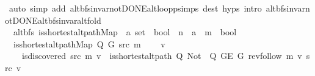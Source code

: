 \begin{isabellebody}
\ {\isacharparenleft}{\kern0pt}auto\ simp\ add{\isacharcolon}{\kern0pt}\ alt{\isacharunderscore}{\kern0pt}bfs{\isacharunderscore}{\kern0pt}invar{\isacharunderscore}{\kern0pt}not{\isacharunderscore}{\kern0pt}DONE{\isachardot}{\kern0pt}alt{\isacharunderscore}{\kern0pt}loop{\isacharunderscore}{\kern0pt}psimps\ dest{\isacharcolon}{\kern0pt}\ {\isachardoublequoteopen}{}{\isachardot}{\kern0pt}hyps{\isachardoublequoteclose}\ intro{\isacharcolon}{\kern0pt}\ alt{\isacharunderscore}{\kern0pt}bfs{\isacharunderscore}{\kern0pt}invar{\isacharunderscore}{\kern0pt}not{\isacharunderscore}{\kern0pt}DONE{\isachardot}{\kern0pt}alt{\isacharunderscore}{\kern0pt}bfs{\isacharunderscore}{\kern0pt}invar{\isacharunderscore}{\kern0pt}alt{\isacharunderscore}{\kern0pt}fold{\isacharparenright}{\kern0pt}\isanewline
\ \ \isamarkupfalse%
\isanewline
{}\isamarkupfalse%
%
\endisatagproof
{\isafoldproof}%
%
\isadelimproof
%
\endisadelimproof
%
\isadelimdocument
%
\endisadelimdocument
%
\isatagdocument
%
\isamarkuptrue%
%
\endisatagdocument
{\isafolddocument}%
%
\isadelimdocument
%
\endisadelimdocument
{}\isamarkupfalse%
\ {\isacharparenleft}{\kern0pt}\ alt{\isacharunderscore}{\kern0pt}bfs{\isacharparenright}{\kern0pt}\ is{\isacharunderscore}{\kern0pt}shortest{\isacharunderscore}{\kern0pt}alt{\isacharunderscore}{\kern0pt}path{\isacharunderscore}{\kern0pt}Map\ {\isacharcolon}{\kern0pt}{\isacharcolon}{\kern0pt}\ {\isachardoublequoteopen}{\isacharparenleft}{\kern0pt}{\isacharprime}{\kern0pt}a\ set\ {\isasymRightarrow}\ bool{\isacharparenright}{\kern0pt}\ {\isasymRightarrow}\ {\isacharprime}{\kern0pt}n\ {\isasymRightarrow}\ {\isacharprime}{\kern0pt}a\ {\isasymRightarrow}\ {\isacharprime}{\kern0pt}m\ {\isasymRightarrow}\ bool{\isachardoublequoteclose}\ \isanewline
\ \ {\isachardoublequoteopen}is{\isacharunderscore}{\kern0pt}shortest{\isacharunderscore}{\kern0pt}alt{\isacharunderscore}{\kern0pt}path{\isacharunderscore}{\kern0pt}Map\ Q\ G\ src\ m\ {\isasymequiv}\isanewline
\ \ \ {\isasymforall}v{\isachardot}{\kern0pt}\isanewline
\ \ \ \ is{\isacharunderscore}{\kern0pt}discovered\ src\ m\ v\ {\isasymlongrightarrow}\ is{\isacharunderscore}{\kern0pt}shortest{\isacharunderscore}{\kern0pt}alt{\isacharunderscore}{\kern0pt}path\ Q\ {\isacharparenleft}{\kern0pt}Not\ {\isasymcirc}\ Q{\isacharparenright}{\kern0pt}\ {\isacharparenleft}{\kern0pt}G{\isachardot}{\kern0pt}E\ G{\isacharparenright}{\kern0pt}\ {\isacharparenleft}{\kern0pt}rev{\isacharunderscore}{\kern0pt}follow\ m\ v{\isacharparenright}{\kern0pt}\ src\ v\ {\isasymand}\isanewline

\end{isabellebody}
